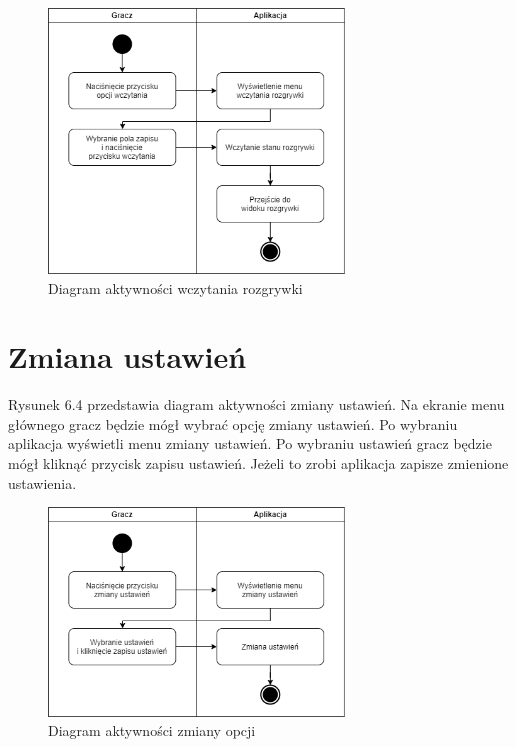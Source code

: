 \begin{figure}[H]
    \centering
        \includegraphics[width=0.7\textwidth]{Graphics/activities/load_game.png}
         \caption{Diagram aktywności wczytania rozgrywki}
\end{figure}

\clearpage

\section{Zmiana ustawień}

Rysunek 6.4 przedstawia diagram aktywności zmiany ustawień.
Na ekranie menu głównego gracz będzie mógł wybrać opcję zmiany ustawień. Po wybraniu aplikacja wyświetli menu zmiany ustawień. Po wybraniu ustawień gracz będzie mógł kliknąć przycisk zapisu ustawień. Jeżeli to zrobi aplikacja zapisze zmienione ustawienia.

\begin{figure}[H]
    \centering
        \includegraphics[width=0.7\textwidth]{Graphics/activities/change_options.png}
         \caption{Diagram aktywności zmiany opcji}
\end{figure}

